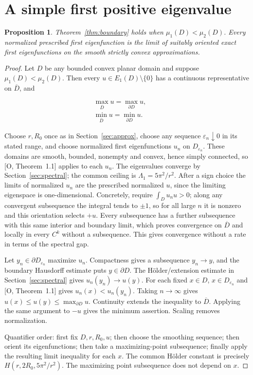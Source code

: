 \documentclass[11pt]{article}
\newtheorem{proposition}[theorem]{Proposition}
\theoremstyle{definition}
\theoremstyle{remark}
\numberwithin{equation}{section}
\begin{document}
\section{A simple first positive eigenvalue}\label{sec:simple}
\begin{proposition}\label{prop:simple}
Theorem~\ref{thm:boundary} holds when $\mu_1(D)<\mu_2(D)$. Every normalized prescribed first eigenfunction is the limit of suitably oriented exact first eigenfunctions on the smooth strictly convex approximations.
\end{proposition}
\begin{proof}
Let $D$ be any bounded convex planar domain and suppose $\mu_1(D)<\mu_2(D)$. Then every $u\in E_1(D)\setminus\{0\}$ has a continuous representative on $\overline D$, and

\begin{equation}\label{eq:src-5-01}
\begin{gathered}
\max_{\overline D}u=\max_{\partial D}u,\qquad \\
\min_{\overline D}u=\min_{\partial D}u.
\end{gathered}
\end{equation}

Choose $r,R_0$ once as in Section~\ref{sec:approx}, choose any sequence $\varepsilon_n\downarrow0$ in its stated range, and choose normalized first eigenfunctions $u_n$ on $D_{\varepsilon_n}$. These domains are smooth, bounded, nonempty and convex, hence simply connected, so [O, Theorem~1.1] applies to each $u_n$. The eigenvalues converge by Section~\ref{sec:spectral}; the common ceiling is $\Lambda_1=5\pi^2/r^2$. After a sign choice the limits of normalized $u_n$ are the prescribed normalized $u$, since the limiting eigenspace is one-dimensional. Concretely, require $\int_Du_nu>0$; along any convergent subsequence the integral tends to $\pm1$, so for all large $n$ it is nonzero and this orientation selects $+u$. Every subsequence has a further subsequence with this same interior and boundary limit, which proves convergence on $\overline D$ and locally in every $C^k$ without a subsequence. This gives convergence without a rate in terms of the spectral gap.

Let $y_n\in\partial D_{\varepsilon_n}$ maximize $u_n$. Compactness gives a subsequence $y_n\to y$, and the boundary Hausdorff estimate puts $y\in\partial D$. The H\"older/extension estimate in Section~\ref{sec:spectral} gives $u_n(y_n)\to u(y)$. For each fixed $x\in D$, $x\in D_{\varepsilon_n}$ and [O, Theorem~1.1] gives $u_n(x)<u_n(y_n)$. Taking $n\to\infty$ gives $u(x)\le u(y)\le\max_{\partial D}u$. Continuity extends the inequality to $\overline D$. Applying the same argument to $-u$ gives the minimum assertion. Scaling removes normalization.

Quantifier order: first fix $D,r,R_0,u$; then choose the smoothing sequence; then orient its eigenfunctions; then take a maximizing-point subsequence; finally apply the resulting limit inequality for each $x$. The common H\"older constant is precisely $H(r,2R_0,5\pi^2/r^2)$. The maximizing point subsequence does not depend on $x$.
\end{proof}
\end{document}
